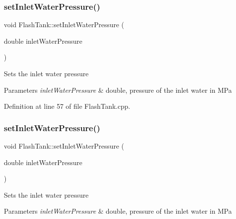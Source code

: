 \subsubsection{\texorpdfstring{set\+Inlet\+Water\+Pressure()}{setInletWaterPressure()}\hspace{0.1cm}{\footnotesize\ttfamily [2/3]}}
{\footnotesize\ttfamily void Flash\+Tank\+::set\+Inlet\+Water\+Pressure (\begin{DoxyParamCaption}\item[{double}]{inlet\+Water\+Pressure }\end{DoxyParamCaption})}

Sets the inlet water pressure 
\begin{DoxyParams}{Parameters}
{\em inlet\+Water\+Pressure} & double, pressure of the inlet water in M\+Pa \\
\hline
\end{DoxyParams}


Definition at line 57 of file Flash\+Tank.\+cpp.

\mbox{\label{class_flash_tank_aed0991a7902401d110fb2f4b472326f5}} 
\subsubsection{\texorpdfstring{set\+Inlet\+Water\+Pressure()}{setInletWaterPressure()}\hspace{0.1cm}{\footnotesize\ttfamily [3/3]}}
{\footnotesize\ttfamily void Flash\+Tank\+::set\+Inlet\+Water\+Pressure (\begin{DoxyParamCaption}\item[{double}]{inlet\+Water\+Pressure }\end{DoxyParamCaption})}

Sets the inlet water pressure 
\begin{DoxyParams}{Parameters}
{\em inlet\+Water\+Pressure} & double, pressure of the inlet water in M\+Pa \\
\hline
\end{DoxyParams}
\mbox{\label{class_flash_tank_a30aa7a42d1547f61b176da4a15e8e8ee}} 
